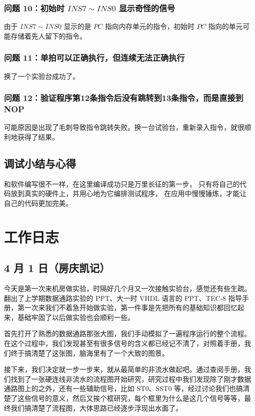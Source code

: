 \documentclass[12pt]{article}
\begin{document}
{        \subsubsection{问题 10：初始时 $INS7\sim INS0$ 显示奇怪的信号}
            由于 $INS7\sim INS0$ 显示的是 $PC$ 指向内存单元的指令，初始时 $PC$ 指向的单元可能存储着先人留下的指令。
        \subsubsection{问题 11：单拍可以正确执行，但连续无法正确执行}
            换了一个实验台成功了。
        \subsubsection{问题 12：验证程序第12条指令后没有跳转到13条指令，而是直接到NOP}
            可能原因是出现了毛刺导致指令跳转失败。换一台试验台，重新录入指令，就很顺利地获得了结果。
            
            
    
    \subsection{调试小结与心得}
    和软件编写很不一样，在这里编译成功只是万里长征的第一步，
    只有将自己的代码放到真实的硬件上，并用心地为它编排测试程序，
    在应用中慢慢锤炼，才能让自己的代码更加完美。

\section{工作日志}
    \subsection{4 月 1 日（房庆凯记）}
        今天是第一次来机房做实验，时隔好几个月又一次接触实验台，感觉还有些生疏。翻出了上学期数据通路实验的 PPT、大一时 VHDL 语言的 PPT、TEC-8 指导手册，第一次来我们不着急开始做实验，第一件事是先把所有的基础知识都回忆起来，基础牢固了以后做实验也会顺利一些。
        
        首先打开了熟悉的数据通路那张大图，我们手动模拟了一遍程序运行的整个流程。在这个过程中，我们发现甚至有很多信号的含义都已经记不清了，对照着手册，我们终于搞清楚了这张图，脑海里有了一个大致的图景。
        
        接下来，我们决定就一步一步来，就从最简单的非流水做起吧。通过查阅手册，我们找到了一张硬连线非流水的流程图开始研究，研究过程中我们发现除了刚才数据通路图上的之外，还有一些辅助信号，比如 ST0、SST0 等，经过讨论我们也搞清楚了这些信号的意义，然后又挨个框研究，每个框里为什么是这几个信号等等，最终我们搞清楚了流程图，大体思路已经逐步浮现出水面了。
        
}
\end{document}
